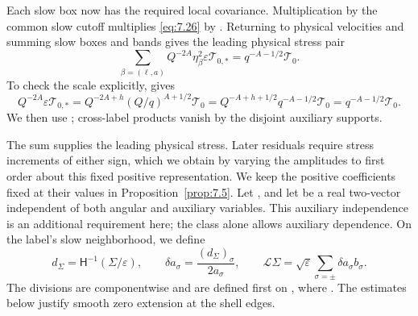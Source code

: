 %
Each slow box now has the required local covariance. Multiplication by the
common slow cutoff  multiplies
\eqref{eq:7.26} by . Returning to physical
velocities and summing slow boxes and bands gives the leading physical stress
pair
\begin{equation}
  \sum_{\beta=(\ell,a)}Q^{-2A}\eta_\beta^2\varepsilon\mathcal T_{0,*}
  =q^{-A-1/2}\mathcal T_0.
  \tag{7.30}\label{eq:7.30}
\end{equation}
To check the scale explicitly,  gives
\[
  Q^{-2A}\varepsilon\mathcal T_{0,*}
  =Q^{-2A+h}(Q/q)^{A+1/2}\mathcal T_0
  =Q^{-A+h+1/2}q^{-A-1/2}\mathcal T_0
  =q^{-A-1/2}\mathcal T_0.
\]
We then use ; cross-label
products vanish by the disjoint auxiliary supports.

The sum supplies the leading physical stress. Later residuals require stress
increments of either sign, which we obtain by varying the amplitudes to first
order about this fixed positive representation. We keep the positive
coefficients  fixed at their values in
Proposition~\ref{prop:7.5}. Let , and
let  be a real two-vector
independent of both angular and auxiliary variables. This auxiliary
independence is an additional requirement here; the class
 alone allows auxiliary dependence. On the
label's slow neighborhood, we define
\begin{equation}
  d_\Sigma=\mathsf H^{-1}(\Sigma/\varepsilon),
  \qquad
  \delta a_\sigma=\frac{(d_\Sigma)_\sigma}{2a_\sigma},
  \qquad
  \mathcal L\Sigma=\sqrt{\varepsilon}\sum_{\sigma=\pm}\delta a_\sigma b_\sigma.
  \tag{7.31}\label{eq:7.31}
\end{equation}
The divisions are componentwise and are defined first on
, where . The
estimates below justify smooth zero extension at the shell edges.

